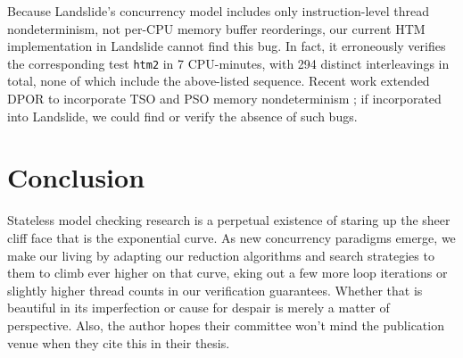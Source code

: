 \documentclass[10pt]{sigplanconf}
\begin{document}
Because Landslide's concurrency model includes only instruction-level thread nondeterminism,
not per-CPU memory buffer reorderings,
our current HTM implementation in Landslide cannot find this bug.
In fact, it erroneously verifies the corresponding test {\tt htm2} in 7 CPU-minutes,
with 294 distinct interleavings in total,
none of which include the above-listed sequence.
Recent work extended DPOR to incorporate TSO and PSO memory nondeterminism \cite{tsopso};
if incorporated into Landslide, we could find or verify the absence of such bugs.


\section{Conclusion}

Stateless model checking research is a perpetual existence of staring up the sheer cliff face that is the exponential curve.
As new concurrency paradigms emerge,
we make our living by adapting our reduction algorithms and search strategies to them to climb ever higher on that curve,
eking out a few more loop iterations or slightly higher thread counts in our verification guarantees.
Whether that is beautiful in its imperfection or cause for despair is merely a matter of perspective.
Also, the author hopes their committee won't mind the publication venue when they cite this in their thesis.




\end{document}
